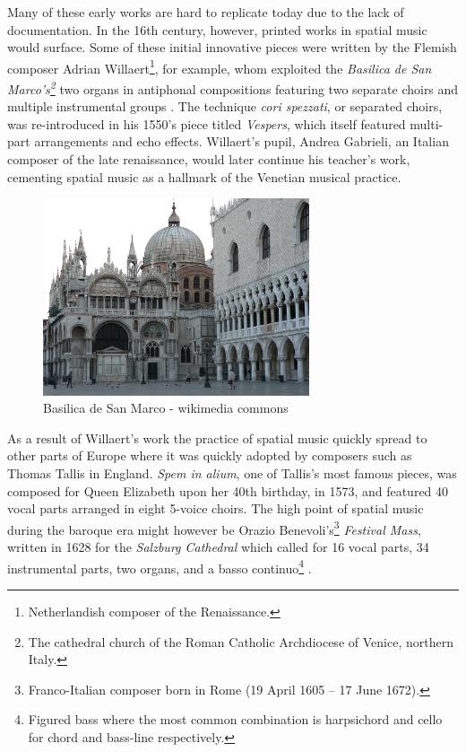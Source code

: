Many of these early works are hard to replicate today due to the lack of documentation. In the 16th century, however, printed works in spatial music would surface. Some of these initial innovative pieces were written by the Flemish composer Adrian Willaert\footnote{Netherlandish composer of the Renaissance.}, for example, whom exploited the \textit{Basilica de San Marco's\footnote{The cathedral church of the Roman Catholic Archdiocese of Venice, northern Italy.}} two organs in antiphonal compositions featuring two separate choirs and multiple instrumental groups \cite{arnold1959significance}. The technique \textit{cori spezzati}, or separated choirs, was re-introduced in his 1550's piece titled \textit{Vespers}, which itself featured multi-part arrangements and echo effects. Willaert's pupil, Andrea Gabrieli, an Italian composer of the late renaissance, would later continue his teacher's work, cementing spatial music as a hallmark of the Venetian musical practice. 

\begin{figure}[ht!]%
\centering
\includegraphics[width=0.7\textwidth]{img/basilica-san-marcos.JPG} 
\caption{Basilica de San Marco - wikimedia commons}
\end{figure}

As a result of Willaert's work the practice of spatial music quickly spread to other parts of Europe where it was quickly adopted by composers such as Thomas Tallis in England. \textit{Spem in alium}, one of Tallis's most famous pieces, was composed for Queen Elizabeth upon her 40th birthday, in 1573, and featured 40 vocal parts arranged in eight 5-voice choirs. The high point of spatial music during the baroque era might however be Orazio Benevoli's\footnote{Franco-Italian composer born in Rome (19 April 1605 – 17 June 1672).} \textit{Festival Mass}, written in 1628 for the \textit{Salzburg Cathedral} which called for 16 vocal parts, 34 instrumental parts, two organs, and a basso continuo\footnote{Figured bass where the most common combination is harpsichord and cello for chord and bass-line respectively.} \cite{zvonar1999history}.

